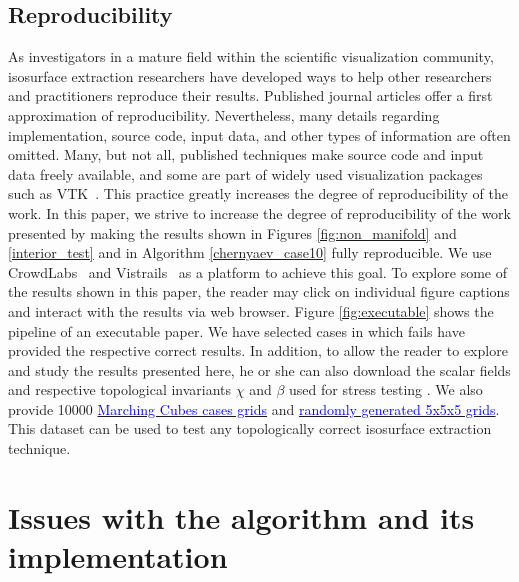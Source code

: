 \subsection{Reproducibility}

As investigators in a mature field within the scientific visualization community, isosurface extraction researchers have developed ways to help other researchers and practitioners reproduce their results. Published journal articles offer a first approximation of reproducibility. Nevertheless, many details regarding implementation, source code, input data, and other types of information are often omitted. Many, but not all, published techniques make source code and input data freely available, and some are part of widely used visualization packages such as VTK~\cite{vtk}. This practice greatly increases the degree of reproducibility of the work. 
In this paper, we strive to increase the degree of reproducibility of the work presented by making the results shown in Figures \ref{fig:non_manifold} and \ref{interior_test} and in Algorithm \ref{chernyaev_case10} fully reproducible. We use CrowdLabs~\cite{Tohline:2010jn} and Vistrails~\cite{Freire:2006va, Silva:2007:PVR:1300781.1302461} as a platform to achieve this goal. To explore some of the results shown in this paper, the  reader may click on individual figure captions and interact with the results via web browser. Figure \ref{fig:executable} shows the pipeline of an executable paper. 
%
We have selected cases in which \mc{} fails have provided the respective correct results. In addition,  to allow the reader to explore and study the results presented here, he or she can also download the scalar fields and respective topological invariants $\chi$ and $\beta$ used for stress testing \mc. We also provide 10000 \href{http://dl.dropbox.com/u/8414964/C-MC33/MarchingCubes_cases.zip}{\textcolor{blue}{Marching Cubes cases grids}} and \href{http://dl.dropbox.com/u/8414964/C-MC33/Closed_Surfaces.zip}{\textcolor{blue}{randomly generated 5x5x5 grids}}. This dataset can be used to test any topologically correct isosurface extraction technique.



\section{Issues with the \mc{} algorithm and its implementation}
\label{erros_cause:chernyaev}

